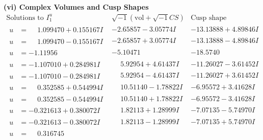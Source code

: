 \documentclass[1p]{elsarticle_modified}
\theoremstyle{definition}
\newcommand{\I}{\sqrt{-1}}
\begin{document}
\newpage\flushleft \textbf{(vi) Complex Volumes and Cusp Shapes}
$$\begin{array}{c|c|c}  
\text{Solutions to }I^u_{1}& \I (\text{vol} + \sqrt{-1}CS) & \text{Cusp shape}\\
 \hline 
\begin{aligned}
u &= \phantom{-}1.099470 + 0.155167 I\end{aligned}
 & -2.65857 - 3.05774 I & -13.13888 + 4.89846 I \\ \hline\begin{aligned}
u &= \phantom{-}1.099470 - 0.155167 I\end{aligned}
 & -2.65857 + 3.05774 I & -13.13888 - 4.89846 I \\ \hline\begin{aligned}
u &= -1.11956\phantom{ +0.000000I}\end{aligned}
 & -5.10471\phantom{ +0.000000I} & -18.5740\phantom{ +0.000000I} \\ \hline\begin{aligned}
u &= -1.107010 + 0.284981 I\end{aligned}
 & \phantom{-}5.92954 + 4.61437 I & -11.26027 - 3.61452 I \\ \hline\begin{aligned}
u &= -1.107010 - 0.284981 I\end{aligned}
 & \phantom{-}5.92954 - 4.61437 I & -11.26027 + 3.61452 I \\ \hline\begin{aligned}
u &= \phantom{-}0.352585 + 0.544994 I\end{aligned}
 & \phantom{-}10.51140 - 1.78822 I & -6.95572 + 3.41628 I \\ \hline\begin{aligned}
u &= \phantom{-}0.352585 - 0.544994 I\end{aligned}
 & \phantom{-}10.51140 + 1.78822 I & -6.95572 - 3.41628 I \\ \hline\begin{aligned}
u &= -0.321613 + 0.380072 I\end{aligned}
 & \phantom{-}1.82113 + 1.28999 I & -7.07135 - 5.74970 I \\ \hline\begin{aligned}
u &= -0.321613 - 0.380072 I\end{aligned}
 & \phantom{-}1.82113 - 1.28999 I & -7.07135 + 5.74970 I \\ \hline\begin{aligned}
u &= \phantom{-}0.316745\phantom{ +0.000000I}\end{aligned}

\end{array}$$
\end{document}
